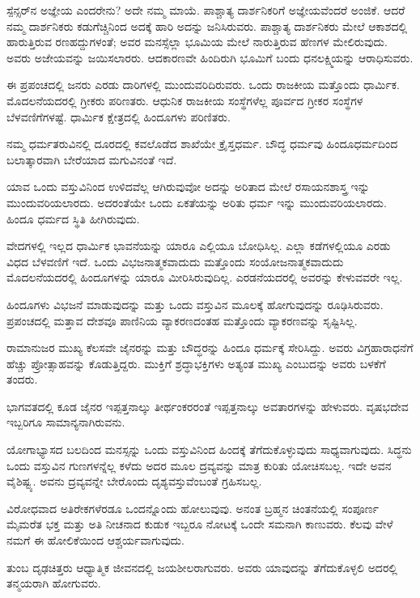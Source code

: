 ಸ್ಪೆನ್ಸರ್‌ನ ಅಜ್ಞೇಯ ಎಂದರೇನು? ಅದೇ ನಮ್ಮ ಮಾಯೆ. ಪಾಶ್ಚಾತ್ಯ ದಾರ್ಶನಿಕರಿಗೆ ಅಜ್ಞೇಯವೆಂದರೆ ಅಂಜಿಕೆ. ಆದರೆ ನಮ್ಮ ದಾರ್ಶನಿಕರು ಕಡುಗೆಚ್ಚಿನಿಂದ ಅದಕ್ಕೆ ಹಾರಿ ಅದನ್ನು ಜನಿಸಿರುವರು. ಪಾಶ್ಚಾತ್ಯ ದಾರ್ಶನಿಕರು ಮೇಲೆ ಆಕಾಶದಲ್ಲಿ ಹಾರುತ್ತಿರುವ ರಣಹದ್ದುಗಳಂತೆ; ಅವರ ಮನಸ್ಸೆಲ್ಲಾ ಭೂಮಿಯ ಮೇಲೆ ನಾರುತ್ತಿರುವ ಹೆಣಗಳ ಮೇಲಿರುವುದು. ಅವರು ಅಜೇಯವನ್ನು ಜಯಿಸಲಾರರು. ಆದಕಾರಣವೇ ಹಿಂದಿರುಗಿ ಭೂಮಿಗೆ ಬಂದು ಧನಲಕ್ಷ್ಮಿಯನ್ನು ಆರಾಧಿಸುವರು.

ಈ ಪ್ರಪಂಚದಲ್ಲಿ ಜನರು ಎರಡು ದಾರಿಗಳಲ್ಲಿ ಮುಂದುವರಿದಿರುವರು. ಒಂದು ರಾಜಕೀಯ ಮತ್ತೊಂದು ಧಾರ್ಮಿಕ. ಮೊದಲನೆಯದರಲ್ಲಿ ಗ್ರೀಕರು ಪರಿಣತರು. ಆಧುನಿಕ ರಾಜಕೀಯ ಸಂಸ್ಥೆಗಳೆಲ್ಲ ಪೂರ್ವದ ಗ್ರೀಕರ ಸಂಸ್ಥೆಗಳ ಬೆಳವಣಿಗೆಗಳಷ್ಟೆ. ಧಾರ್ಮಿಕ ಕ್ಷೇತ್ರದಲ್ಲಿ ಹಿಂದೂಗಳು ಪರಿಣಿತರು.

ನಮ್ಮ ಧರ್ಮತರುವಿನಲ್ಲಿ ದೂರದಲ್ಲಿ ಕವಲೊಡೆದ ಶಾಖೆಯೇ ಕ್ರೈಸ್ತಧರ್ಮ. ಬೌದ್ಧ ಧರ್ಮವು ಹಿಂದೂಧರ್ಮದಿಂದ ಬಲಾತ್ಕಾರವಾಗಿ ಬೇರೆಯಾದ ಮಗುವಿನಂತೆ ಇದೆ.

ಯಾವ ಒಂದು ವಸ್ತುವಿನಿಂದ ಉಳಿದವೆಲ್ಲ ಆಗಿರುವುವೋ ಅದನ್ನು ಅರಿತಾದ ಮೇಲೆ ರಸಾಯನಶಾಸ್ತ್ರ ಇನ್ನು ಮುಂದುವರಿಯಲಾರದು. ಅದರಂತೆಯೇ ಒಂದು ಏಕತೆಯನ್ನು ಅರಿತು ಧರ್ಮ ಇನ್ನು ಮುಂದುವರಿಯಲಾರದು. ಹಿಂದೂ ಧರ್ಮದ ಸ್ಥಿತಿ ಹೀಗಿರುವುದು.

ವೇದಗಳಲ್ಲಿ ಇಲ್ಲದ ಧಾರ್ಮಿಕ ಭಾವನೆಯನ್ನು ಯಾರೂ ಎಲ್ಲಿಯೂ ಬೋಧಿಸಿಲ್ಲ. ಎಲ್ಲಾ ಕಡೆಗಳಲ್ಲಿಯೂ ಎರಡು ವಿಧದ ಬೆಳವಣಿಗೆ ಇದೆ. ಒಂದು ವಿಭಜನಾತ್ಮಕವಾದುದು  ಮತ್ತೊಂದು ಸಂಯೋಜನಾತ್ಮಕವಾದುದು  ಮೊದಲನೆಯದರಲ್ಲಿ ಹಿಂದೂಗಳನ್ನು ಯಾರೂ ಮೀರಿಸಿರುವುದಿಲ್ಲ. ಎರಡನೆಯದರಲ್ಲಿ ಅವರನ್ನು ಕೇಳುವವರೇ ಇಲ್ಲ.

ಹಿಂದೂಗಳು ವಿಭಜನೆ ಮಾಡುವುದನ್ನು ಮತ್ತು ಒಂದು ವಸ್ತುವಿನ ಮೂಲಕ್ಕೆ ಹೋಗುವುದನ್ನು ರೂಢಿಸಿರುವರು. ಪ್ರಪಂಚದಲ್ಲಿ ಮತ್ತಾವ ದೇಶವೂ ಪಾಣಿನಿಯ ವ್ಯಾಕರಣದಂತಹ ಮತ್ತೊಂದು ವ್ಯಾಕರಣವನ್ನು ಸೃಷ್ಟಿಸಿಲ್ಲ.

ರಾಮಾನುಜರ ಮುಖ್ಯ ಕೆಲಸವೇ ಜೈನರನ್ನು ಮತ್ತು ಬೌದ್ಧರನ್ನು ಹಿಂದೂ ಧರ್ಮಕ್ಕೆ ಸೇರಿಸಿದ್ದು. ಅವರು ವಿಗ್ರಹಾರಾಧನೆಗೆ ಹೆಚ್ಚು ಪ್ರೋತ್ಸಾಹವನ್ನು ಕೊಡುತ್ತಿದ್ದರು. ಮುಕ್ತಿಗೆ ಶ್ರದ್ಧಾಭಕ್ತಿಗಳು ಅತ್ಯಂತ ಮುಖ್ಯ ಎಂಬುದನ್ನು ಅವರು ಬಳಕೆಗೆ ತಂದರು.

ಭಾಗವತದಲ್ಲಿ ಕೂಡ ಜೈನರ ಇಪ್ಪತ್ತನಾಲ್ಕು ತೀರ್ಥಂಕರರಂತೆ ಇಪ್ಪತ್ತನಾಲ್ಕು ಅವತಾರಗಳನ್ನು ಹೇಳುವರು. ವೃಷಭದೇವ ಇಬ್ಬರಿಗೂ ಸಾಮಾನ್ಯನಾಗಿರುವನು.

ಯೋಗಾಭ್ಯಾಸದ ಬಲದಿಂದ ಮನಸ್ಸನ್ನು ಒಂದು ವಸ್ತುವಿನಿಂದ ಹಿಂದಕ್ಕೆ ತೆಗೆದುಕೊಳ್ಳುವುದು ಸಾಧ್ಯವಾಗುವುದು. ಸಿದ್ಧನು ಒಂದು ವಸ್ತುವಿನ ಗುಣಗಳನ್ನೆಲ್ಲ ಕಳೆದು ಅದರ ಮೂಲ ದ್ರವ್ಯವನ್ನು ಮಾತ್ರ ಕುರಿತು ಯೋಚಿಸಬಲ್ಲ. ಇದೇ ಅವನ ವೈಶಿಷ್ಟ್ಯ. ಅವನು ದ್ರವ್ಯವನ್ನೇ ಬೇರೊಂದು ದೃಶ್ಯವಸ್ತುವೆಂಬಂತೆ ಗ್ರಹಿಸಬಲ್ಲ.

ವಿರೋಧವಾದ ಅತಿರೇಕಗಳೆರಡೂ ಒಂದನ್ನೊಂದು ಹೋಲುವುವು. ಅನಂತ ಬ್ರಹ್ಮನ ಚಿಂತನೆಯಲ್ಲಿ ಸಂಪೂರ್ಣ ಮೈಮರೆತ ಭಕ್ತ ಮತ್ತು ಅತಿ ನೀಚನಾದ ಕುಡುಕ ಇಬ್ಬರೂ ನೋಟಕ್ಕೆ ಒಂದೇ ಸಮನಾಗಿ ಕಾಣುವರು. ಕೆಲವು ವೇಳೆ ನಮಗೆ ಈ ಹೋಲಿಕೆಯಿಂದ ಆಶ್ಚರ್ಯವಾಗುವುದು.

ತುಂಬ ದೃಢಚಿತ್ತರು ಆಧ್ಯಾತ್ಮಿಕ ಜೀವನದಲ್ಲಿ ಜಯಶೀಲರಾಗುವರು. ಅವರು ಯಾವುದನ್ನು ತೆಗೆದುಕೊಳ್ಳಲಿ ಅದರಲ್ಲಿ ತನ್ಮಯರಾಗಿ ಹೋಗುವರು.

